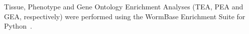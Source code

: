 \documentclass[10pt,letterpaper,twocolumn]{article}
\begin{document}
Tissue, Phenotype and Gene Ontology Enrichment
Analyses (TEA, PEA and GEA, respectively) were performed using the WormBase
Enrichment Suite for Python~\cite{Angeles-Albores2016}.


%
\end{document}
